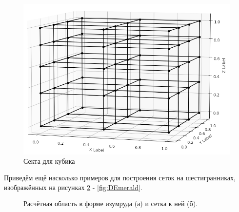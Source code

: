 \begin{figure}
	\centering
	\vspace*{0.7cm}
	\includegraphics[width=0.7\linewidth]{images/GridCube.png}
	\caption{Секта для кубика}
	\label{fig:GridCube}
\end{figure}

Приведём ещё насколько примеров для построения сеток на шестигранниках, изображённых на рисунках  \ref{fig:Emerald} - \ref{fig:DEmerald}.

\begin{figure}
	\begin{minipage}[h]{0.49\linewidth}
	\end{minipage}
	\hfill
	\begin{minipage}[h]{0.49\linewidth}
	\end{minipage}
	\caption{Расчётная область в форме изумруда (а) и сетка к ней (б).}
	\label{fig:Emerald}
\end{figure}

